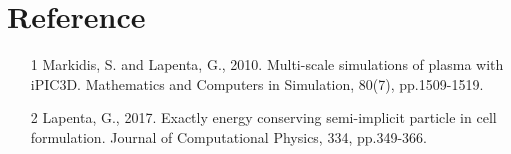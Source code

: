 \documentclass[a4paper, 11pt]{article}
\begin{document}
\section{Reference}
\begin{itemize}
\item[1] Markidis, S. and Lapenta, G., 2010. Multi-scale simulations of plasma with iPIC3D. Mathematics and Computers in Simulation, 80(7), pp.1509-1519.
\item[2] Lapenta, G., 2017. Exactly energy conserving semi-implicit particle in cell formulation. Journal of Computational Physics, 334, pp.349-366.
\end{itemize}
\end{document}
